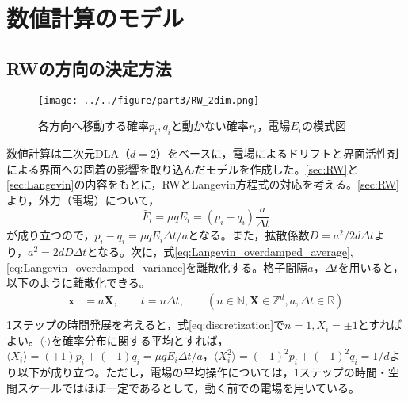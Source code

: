 \documentclass[autodetect-engine,dvi=dvipdfmx,a4paper,ja=standard,oneside,openany,11pt,draft]{bxjsbook}
\begin{document}
\section{数値計算のモデル}
\subsection{RWの方向の決定方法}
\begin{figure}[htbp]
  \centering
  \texttt{[image: ../../figure/part3/RW\_2dim.png]}
  \caption{各方向へ移動する確率$p_i,q_i$と動かない確率$r_i$，電場$E_i$の模式図}
  \label{fig:RW_2dim}
\end{figure}

数値計算は二次元DLA（$d=2$）をベースに，電場によるドリフトと界面活性剤による界面への固着の影響を取り込んだモデルを作成した。\ref{sec:RW}と\ref{sec:Langevin}の内容をもとに，RWとLangevin方程式の対応を考える。\ref{sec:RW}より，外力（電場）について，
\begin{equation}
  \bar{F}_i=\mu q E_i=(p_i-q_i)\frac{a}{\Delta t}
  \label{eq:force}
\end{equation}が成り立つので，$p_i-q_i=\mu q E_i\Delta t/a$となる。また，拡散係数$D=a^2/2d\Delta t$より，$a^2=2dD\Delta t$となる。次に，式\ref{eq:Langevin_overdamped_average},\ref{eq:Langevin_overdamped_variance}を離散化する。格子間隔$a$，$\Delta t$を用いると，以下のように離散化できる。
\begin{equation}
  \begin{split}
    \bm{x} & =a\bm{X}, \qquad t=n\Delta t, \qquad (n\in\mathbb{N},\bm{X}\in\mathbb{Z}^d,a,\Delta t \in \mathbb{R}) \\
    \label{eq:discretization}
  \end{split}
\end{equation}
1ステップの時間発展を考えると，式\ref{eq:discretization}で$n=1,X_i=\pm1$とすればよい。$\langle\cdot\rangle$を確率分布に関する平均とすれば，$\langle X_i\rangle=(+1)p_i+(-1)q_i=\mu q E_i\Delta t/a$，$\langle X_i^2\rangle=(+1)^2p_i+(-1)^2q_i=1/d$より以下が成り立つ。ただし，電場の平均操作については，1ステップの時間・空間スケールではほぼ一定であるとして，動く前での電場を用いている。
\end{document}
